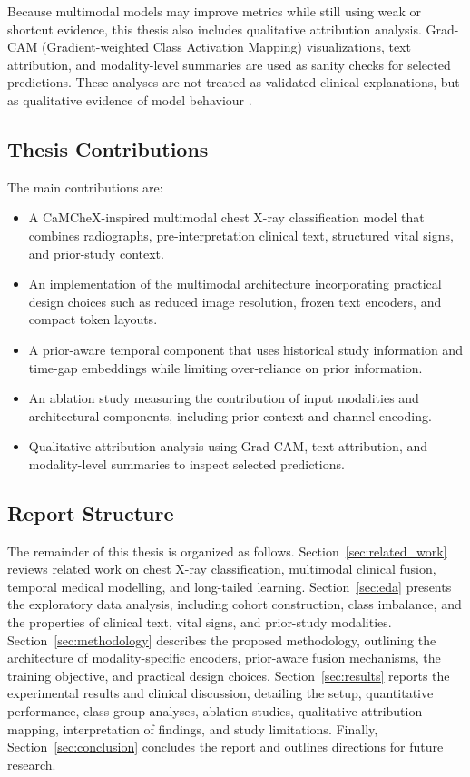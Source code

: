 Because multimodal models may improve metrics while still using weak or shortcut evidence, this thesis also includes qualitative attribution analysis. Grad-CAM (Gradient-weighted Class Activation Mapping) visualizations, text attribution, and modality-level summaries are used as sanity checks for selected predictions. These analyses are not treated as validated clinical explanations, but as qualitative evidence of model behaviour \cite{selvaraju2017gradcam}.

\subsection{Thesis Contributions}\label{subsec}

The main contributions are:\begin{itemize}\item A CaMCheX-inspired multimodal chest X-ray classification model that combines radiographs, pre-interpretation clinical text, structured vital signs, and prior-study context.\item An implementation of the multimodal architecture incorporating practical design choices such as reduced image resolution, frozen text encoders, and compact token layouts.\item A prior-aware temporal component that uses historical study information and time-gap embeddings while limiting over-reliance on prior information.\item An ablation study measuring the contribution of input modalities and architectural components, including prior context and channel encoding.\item Qualitative attribution analysis using Grad-CAM, text attribution, and modality-level summaries to inspect selected predictions.\end{itemize}

\subsection{Report Structure}\label{subsec:report_structure}

The remainder of this thesis is organized as follows. Section~\ref{sec:related_work} reviews related work on chest X-ray classification, multimodal clinical fusion, temporal medical modelling, and long-tailed learning. Section~\ref{sec:eda} presents the exploratory data analysis, including cohort construction, class imbalance, and the properties of clinical text, vital signs, and prior-study modalities. Section~\ref{sec:methodology} describes the proposed methodology, outlining the architecture of modality-specific encoders, prior-aware fusion mechanisms, the training objective, and practical design choices. Section~\ref{sec:results} reports the experimental results and clinical discussion, detailing the setup, quantitative performance, class-group analyses, ablation studies, qualitative attribution mapping, interpretation of findings, and study limitations. Finally, Section~\ref{sec:conclusion} concludes the report and outlines directions for future research.